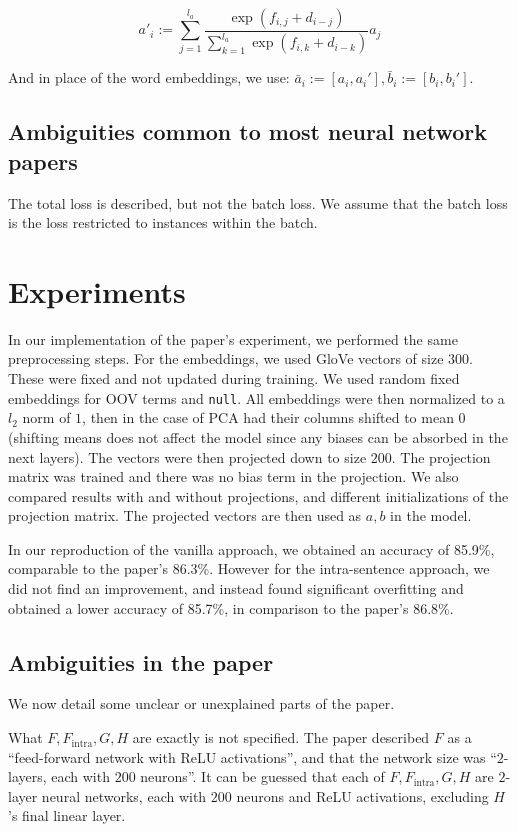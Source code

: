 \documentclass{article}
\begin{document}
\[a'_i := \sum_{j=1}^{l_a} \frac{\exp(f_{i,j} + d_{i-j})}{\sum_{k=1}^{l_a} \exp(f_{i,k} + d_{i-k})} a_j\]

And in place of the word embeddings, we use: $\bar{a}_i := [a_i, a_i'], \bar{b}_i := [b_i, b_i']$.

\subsection{Ambiguities common to most neural network papers}
The total loss is described, but not the batch loss. We assume that the batch loss is the loss restricted to instances within the batch.

\section{Experiments}
In our implementation of the paper's experiment, we performed the same preprocessing steps. For the embeddings, we used GloVe vectors of size $300$. These were fixed and not updated during training. We used random fixed embeddings for OOV terms and \texttt{null}. All embeddings were then normalized to a $l_2$ norm of $1$, then in the case of PCA had their columns shifted to mean $0$ (shifting means does not affect the model since any biases can be absorbed in the next layers). The vectors were then projected down to size $200$. The projection matrix was trained and there was no bias term in the projection. We also compared results with and without projections, and different initializations of the projection matrix. The projected vectors are then used as $a, b$ in the model.

In our reproduction of the vanilla approach, we obtained an accuracy of 85.9\%, comparable to the paper's 86.3\%. However for the intra-sentence approach, we did not find an improvement, and instead found significant overfitting and obtained a lower accuracy of 85.7\%, in comparison to the paper's 86.8\%.

\subsection{Ambiguities in the paper}
We now detail some unclear or unexplained parts of the paper.

What $F, F_\text{intra}, G, H$ are exactly is not specified. The paper described $F$ as a ``feed-forward network with ReLU activations'', and that the network size was ``$2$-layers, each with $200$ neurons''. It can be guessed that each of $F, F_\text{intra}, G, H$ are $2$-layer neural networks, each with $200$ neurons and ReLU activations, excluding $H$'s final linear layer.
\end{document}
